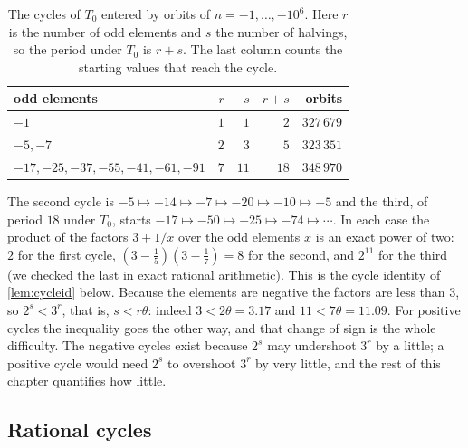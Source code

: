 \begin{table}[ht]
\centering
\caption{The cycles of $T_0$ entered by orbits of $n=-1,\dots,-10^{6}$. Here
$r$ is the number of odd elements and $s$ the number of halvings, so the
period under $T_0$ is $r+s$. The last column counts the starting values that
reach the cycle.}
\label{tab:ch8:negative}
\begin{tabular}{@{}lrrrr@{}}
\toprule
odd elements & $r$ & $s$ & $r+s$ & orbits \\
\midrule
$-1$ & $1$ & $1$ & $2$ & $327\,679$ \\
$-5,-7$ & $2$ & $3$ & $5$ & $323\,351$ \\
$-17,-25,-37,-55,-41,-61,-91$ & $7$ & $11$ & $18$ & $348\,970$ \\
\bottomrule
\end{tabular}
\end{table}

The second cycle is $-5\mapsto-14\mapsto-7\mapsto-20\mapsto-10\mapsto-5$ and
the third, of period $18$ under $T_0$, starts
$-17\mapsto-50\mapsto-25\mapsto-74\mapsto\cdots$. In each case the product of
the factors $3+1/x$ over the odd elements $x$ is an exact power of two: $2$
for the first cycle, $(3-\tfrac15)(3-\tfrac17)=8$ for the second, and $2^{11}$
for the third (we checked the last in exact rational arithmetic). This is the
cycle identity of \cref{lem:cycleid} below. Because the elements are negative
the factors are less than $3$, so $2^s<3^r$, that is, $s<r\theta$: indeed
$3<2\theta=3.17$ and $11<7\theta=11.09$. For positive cycles the inequality
goes the other way, and that change of sign is the whole difficulty. The
negative cycles exist because $2^s$ may undershoot $3^r$ by a little; a
positive cycle would need $2^s$ to overshoot $3^r$ by very little, and the
rest of this chapter quantifies how little.

\subsection{Rational cycles}\label{sec:ch8:rational}

